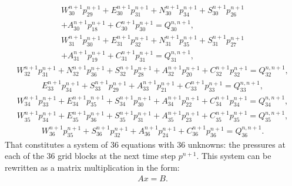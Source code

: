 %
\begin{multline}
	W^{n+1}_{30}p^{n+1}_{29}+E^{n+1}_{30}p^{n+1}_{31}+N^{n+1}_{30}p^{n+1}_{34}+S^{n+1}_{30}p^{n+1}_{26}\\+A^{n+1}_{30}p^{n+1}_{18}+C^{n+1}_{30}p^{n+1}_{30}=Q^{n, n+1}_{30},
\end{multline}
%
\begin{multline}
	W^{n+1}_{31}p^{n+1}_{30}+E^{n+1}_{31}p^{n+1}_{32}+N^{n+1}_{31}p^{n+1}_{35}+S^{n+1}_{31}p^{n+1}_{27}\\+A^{n+1}_{31}p^{n+1}_{19}+C^{n+1}_{31}p^{n+1}_{31}=Q^{n, n+1}_{31},
\end{multline}
%
\begin{multline}
	W^{n+1}_{32}p^{n+1}_{31}+N^{n+1}_{32}p^{n+1}_{36}+S^{n+1}_{32}p^{n+1}_{28}+A^{n+1}_{32}p^{n+1}_{20}+C^{n+1}_{32}p^{n+1}_{32}=Q^{n, n+1}_{32},
\end{multline}
%
\begin{multline}
	E^{n+1}_{33}p^{n+1}_{34}+S^{n+1}_{33}p^{n+1}_{29}+A^{n+1}_{33}p^{n+1}_{21}+C^{n+1}_{33}p^{n+1}_{33}=Q^{n, n+1}_{33},
\end{multline}
%
\begin{multline}
	W^{n+1}_{34}p^{n+1}_{33}+E^{n+1}_{34}p^{n+1}_{35}+S^{n+1}_{34}p^{n+1}_{30}+A^{n+1}_{34}p^{n+1}_{22}+C^{n+1}_{34}p^{n+1}_{34}=Q^{n, n+1}_{34},
\end{multline}
%
\begin{multline}
	W^{n+1}_{35}p^{n+1}_{34}+E^{n+1}_{35}p^{n+1}_{36}+S^{n+1}_{35}p^{n+1}_{31}+A^{n+1}_{35}p^{n+1}_{23}+C^{n+1}_{35}p^{n+1}_{35}=Q^{n, n+1}_{35},
\end{multline}
%
\begin{multline}
	\label{equation-example-evaluation-grid-block-36}
	W^{n+1}_{36}p^{n+1}_{35}+S^{n+1}_{36}p^{n+1}_{32}+A^{n+1}_{36}p^{n+1}_{24}+C^{n+1}_{36}p^{n+1}_{36}=Q^{n, n+1}_{36}.
\end{multline}
%
That constitutes a system of 36 equations with 36 unknowns: the pressures at each of the 36 grid blocks at the next time step $p^{n+1}$.
%
This system can be rewritten as a matrix multiplication in the form:
%
%
\begin{align}
	A x = B.
\end{align}
